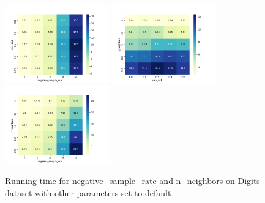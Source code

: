 \begin{enumerate}[1)]
\begin{figure}[H]
\centering  %
{
\label{Fig.sub.1}
\includegraphics[width=4.5cm,height=4.5cm\textwidth]{images/umap/comparison/Digit_elapsed_time_min_dist_negative_sample_rate_heatmap.png}}
{
\label{Fig.sub.2}
\includegraphics[width=4.5cm,height=4.5cm\textwidth]{images/umap/comparison/Digit_elapsed_time_n_neighbors_min_dist_heatmap.png}}
{
\label{Fig.sub.3}
\includegraphics[width=4.5cm,height=4.5cm\textwidth]{images/umap/comparison/Digit_elapsed_time_n_neighbors_negative_sample_rate_heatmap.png}}
\centering
\caption{Running time for negative\_sample\_rate and n\_neighbors on Digits dataset with other parameters set to default}
\end{figure}



\end{enumerate}
